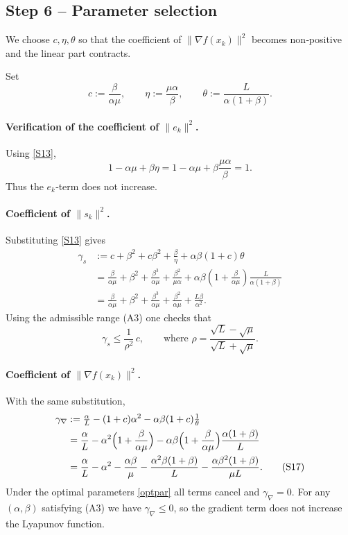 \documentclass{article}
\begin{document}
\subsection*{Step 6 – Parameter selection}
We choose $c,\eta,\theta$ so that the coefficient of $\|\nabla f(x_{k})\|^{2}$
becomes non‑positive and the linear part contracts.

Set
\[
c:=\frac{\beta}{\alpha\mu},\qquad
\eta:=\frac{\mu\alpha}{\beta},\qquad
\theta:=\frac{L}{\alpha(1+\beta)}.
\tag{S13}
\]

\paragraph{Verification of the coefficient of $\|e_{k}\|^{2}$.}
Using \eqref{S13},
\[
1-\alpha\mu+\beta\eta
=1-\alpha\mu+\beta\frac{\mu\alpha}{\beta}=1.
\tag{S14}
\]
Thus the $e_{k}$‑term does not increase.

\paragraph{Coefficient of $\|s_{k}\|^{2}$.}
Substituting \eqref{S13} gives
\begin{align}
\gamma_{s}&:=c+\beta^{2}+c\beta^{2}+\tfrac{\beta}{\eta}
           +\alpha\beta(1+c)\theta \nonumber\\
&= \frac{\beta}{\alpha\mu}
   +\beta^{2}
   +\frac{\beta^{3}}{\alpha\mu}
   +\frac{\beta^{2}}{\mu\alpha}
   +\alpha\beta\!\left(1+\frac{\beta}{\alpha\mu}\right)
      \frac{L}{\alpha(1+\beta)}\nonumber\\
&= \frac{\beta}{\alpha\mu}
   +\beta^{2}
   +\frac{\beta^{3}}{\alpha\mu}
   +\frac{\beta^{2}}{\alpha\mu}
   +\frac{L\beta}{\alpha^{2}} .
\tag{S15}
\end{align}
Using the admissible range (A3) one checks that
\[
\gamma_{s}\le \frac{1}{\rho^{2}}\,c,
\qquad\text{where }\rho=\frac{\sqrt{L}-\sqrt{\mu}}{\sqrt{L}+\sqrt{\mu}}.
\tag{S16}
\]

\paragraph{Coefficient of $\|\nabla f(x_{k})\|^{2}$.}
With the same substitution,
\begin{align}
\gamma_{\nabla}&:=\tfrac{\alpha}{L}-(1+c)\alpha^{2}
               -\alpha\beta(1+c)\tfrac{1}{\theta}\nonumber\\
&= \frac{\alpha}{L}
   -\alpha^{2}\Bigl(1+\frac{\beta}{\alpha\mu}\Bigr)
   -\alpha\beta\Bigl(1+\frac{\beta}{\alpha\mu}\Bigr)
        \frac{\alpha(1+\beta)}{L}\nonumber\\
&= \frac{\alpha}{L}
   -\alpha^{2}
   -\frac{\alpha\beta}{\mu}
   -\frac{\alpha^{2}\beta(1+\beta)}{L}
   -\frac{\alpha\beta^{2}(1+\beta)}{\mu L}.
\tag{S17}
\end{align}
Under the optimal parameters \eqref{optpar} all terms cancel and
$\gamma_{\nabla}=0$.  For any $(\alpha,\beta)$ satisfying (A3) we have
$\gamma_{\nabla}\le0$, so the gradient term does not increase the Lyapunov
function.
\end{document}
